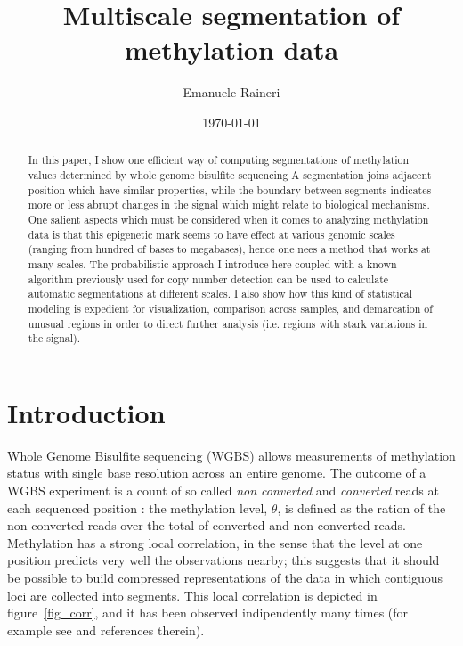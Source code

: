 \documentclass[12pt]{amsart}
\begin{document}
\title{Multiscale segmentation of methylation data}
\author{Emanuele Raineri}
\date{\today}
\maketitle

\begin{abstract}
In this paper, I show one efficient way of computing 
segmentations of methylation values determined by 
whole genome bisulfite sequencing
A segmentation joins adjacent position
which have similar properties, while the boundary between segments 
indicates more or less abrupt changes
in the signal which might relate to biological mechanisms. 
One salient aspects which must be considered when it comes to 
analyzing methylation data is that this epigenetic mark seems 
to have effect at various genomic scales 
(ranging from hundred of bases to megabases), hence 
one nees a method that works at many scales. 
The probabilistic approach I introduce here 
coupled with a known algorithm previously
used for copy number detection
can be used to calculate automatic segmentations at different scales.
I also show how this 
kind of statistical modeling is expedient for 
visualization, comparison across samples,
and demarcation of unusual regions in 
order to direct further analysis (i.e. regions with stark variations in the signal).
\end{abstract}

\section{Introduction}

Whole Genome Bisulfite sequencing (WGBS) allows measurements of methylation 
status with single base resolution across an entire genome. The outcome
of a WGBS experiment is a count of so called {\it non converted} and {\it converted} 
reads at each 
sequenced position : the methylation level, $\theta$, is defined
as the ration of the non converted reads over the total of converted and non converted reads.
Methylation has a strong local correlation,
in the sense that the level at one position predicts 
very well the observations nearby; this suggests that it should be possible
to build compressed representations of the data in which contiguous loci 
are collected into segments.
This local correlation is depicted in figure~\ref{fig_corr},
and it has been observed indipendently many times (for example
see \cite{bsmooth} and references therein).
\end{document}
